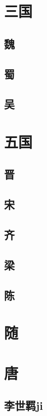 \documentclass[UTF8,a4paper,8pt]{ctexbook}
\begin{document}
		
			
	\section{三国}
		\subsection{魏}
		
		
		\subsection{蜀}
		
		
		\subsection{吴}
		
		
		
	\section{五国}
		\subsection{晋}
		
		\subsection{宋}
		
		\subsection{齐}
		
		\subsection{梁}
		
		\subsection{陈}			
		
	\section{随}
	
	
	\section{唐}
		
		\subsection{李世羁ji}
	
		
\end{document}
